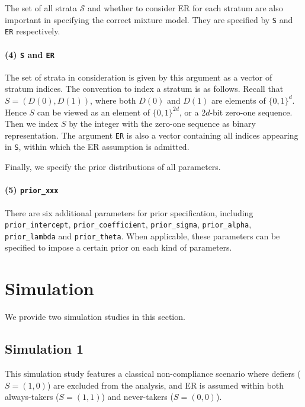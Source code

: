 \documentclass{article}
\begin{document}
The set of all strata $\mathcal{S}$ and whether to consider ER for each stratum are also important in specifying the correct mixture model. They are specified by \texttt{S} and \texttt{ER} respectively.

\paragraph{(4) \texttt{S} and \texttt{ER}} The set of strata in consideration is given by this argument as a vector of stratum indices. The convention to index a stratum is as follows. Recall that $S = (D(0), D(1))$, where both $D(0)$ and $D(1)$ are elements of $\{0, 1\}^d$. Hence $S$ can be viewed as an element of $\{0, 1\}^{2d}$, or a $2d$-bit zero-one sequence. Then we index $S$ by the integer with the zero-one sequence as binary representation. The argument \texttt{ER} is also a vector containing all indices appearing in \texttt{S}, within which the ER assumption is admitted.

Finally, we specify the prior distributions of all parameters.

\paragraph{(5) \texttt{prior\_xxx}} There are six additional parameters for prior specification, including \texttt{prior\_intercept}, \texttt{prior\_coefficient}, \texttt{prior\_sigma}, \texttt{prior\_alpha}, \texttt{prior\_lambda} and \texttt{prior\_theta}. When applicable, these parameters can be specified to impose a certain prior on each kind of parameters.

\section{Simulation}

We provide two simulation studies in this section.

\subsection{Simulation 1} 
This simulation study features a classical non-compliance scenario where defiers ($S = (1, 0)$) are excluded from the analysis, and ER is assumed within both always-takers ($S = (1,1)$) and never-takers ($S = (0, 0)$).
\end{document}
